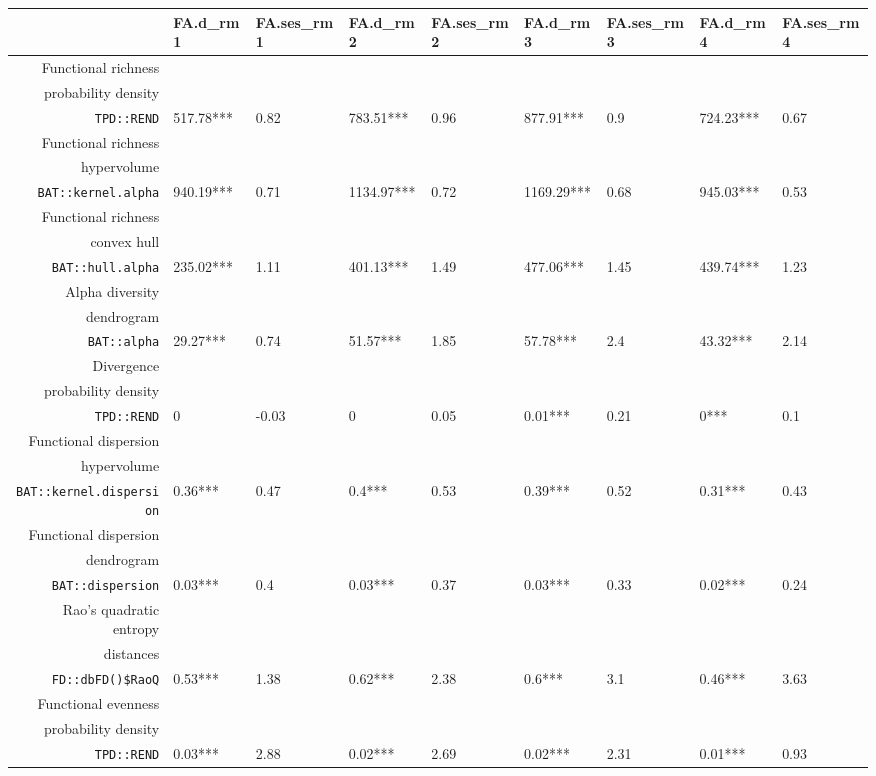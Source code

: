 \begin{table}[ht]
\centering
\scriptsize
\begin{tabular}{rllllllll}
  \hline
 & FA.d\_rm1 & FA.ses\_rm1 & FA.d\_rm2 & FA.ses\_rm2 & FA.d\_rm3 & FA.ses\_rm3 & FA.d\_rm4 & FA.ses\_rm4 \\ 
  \hline
Functional richness\\ probability density\\ \texttt{TPD::REND} & 517.78*** & 0.82 & 783.51*** & 0.96 & 877.91*** & 0.9 & 724.23*** & 0.67 \\ 
  Functional richness\\ hypervolume\\ \texttt{BAT::kernel.alpha} & 940.19*** & 0.71 & 1134.97*** & 0.72 & 1169.29*** & 0.68 & 945.03*** & 0.53 \\ 
  Functional richness\\ convex hull\\ \texttt{BAT::hull.alpha} & 235.02*** & 1.11 & 401.13*** & 1.49 & 477.06*** & 1.45 & 439.74*** & 1.23 \\ 
  Alpha diversity\\ dendrogram\\ \texttt{BAT::alpha} & 29.27*** & 0.74 & 51.57*** & 1.85 & 57.78*** & 2.4 & 43.32*** & 2.14 \\ 
  Divergence\\ probability density\\ \texttt{TPD::REND} & 0 & -0.03 & 0 & 0.05 & 0.01*** & 0.21 & 0*** & 0.1 \\ 
  Functional dispersion\\ hypervolume\\ \texttt{BAT::kernel.dispersion} & 0.36*** & 0.47 & 0.4*** & 0.53 & 0.39*** & 0.52 & 0.31*** & 0.43 \\ 
  Functional dispersion\\ dendrogram\\ \texttt{BAT::dispersion} & 0.03*** & 0.4 & 0.03*** & 0.37 & 0.03*** & 0.33 & 0.02*** & 0.24 \\ 
  Rao's quadratic entropy\\ distances\\ \texttt{FD::dbFD()\$RaoQ} & 0.53*** & 1.38 & 0.62*** & 2.38 & 0.6*** & 3.1 & 0.46*** & 3.63 \\ 
  Functional evenness\\ probability density\\ \texttt{TPD::REND} & 0.03*** & 2.88 & 0.02*** & 2.69 & 0.02*** & 2.31 & 0.01*** & 0.93 \\ 

\end{tabular}
\end{table}
